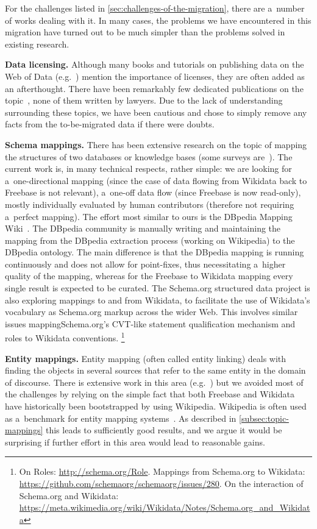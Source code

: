\documentclass{sig-alternate-2013}
\begin{document}
For the challenges listed in \autoref{sec:challenges-of-the-migration},
there are a~number of works dealing with it. In many cases, the problems we have encountered in
this migration have turned out to be much simpler than the problems solved in existing research.

\textbf{Data licensing.}
Although many books and tutorials on publishing data on the Web of Data
(e.g.~\cite{linkeddatabook,linkeddatabestpractises}) mention the importance of licenses,
they are often added as an afterthought.
There have been remarkably few dedicated publications on the
topic~\cite{licenses,licensius}, none of them written by lawyers.
Due to the lack of understanding surrounding these topics, we have been
cautious and chose to simply remove any facts from the to-be-migrated data
if there were doubts.

\textbf{Schema mappings.}
There has been extensive research on the topic of mapping the structures
of two databases or knowledge bases
(some surveys are~\cite{mappingsurvey3,mappingsurvey2,mappingsurvey1}).
The current work is, in many technical respects, rather simple:
we are looking for a~one-directional mapping (since the case of data
flowing from Wikidata back to Freebase is not relevant),
a~one-off data flow (since Freebase is now read-only),
mostly individually evaluated by human contributors
(therefore not requiring a~perfect mapping).
The effort most similar to ours is the DBpedia Mapping Wiki~\cite{lehmann2014dbpedia}.
The DBpedia community is manually writing and maintaining the mapping from
the DBpedia extraction process (working on Wikipedia) to the DBpedia ontology.
The main difference is that the DBpedia mapping is running continuously
and does not allow for point-fixes, thus necessitating a~higher quality of the mapping,
whereas for the Freebase to Wikidata mapping every single result is expected to be curated.
The Schema.org structured data project is also exploring mappings to and from Wikidata,
to facilitate the use of Wikidata's vocabulary as Schema.org markup across the wider Web.
This involves similar issues mapping\linebreak Schema.org's CVT-like statement qualification mechanism and roles
to Wikidata conventions.%
\footnote{On Roles: \url{http://schema.org/Role}. Mappings from Schema.org to Wikidata:
\url{https://github.com/schemaorg/schemaorg/issues/280}. On the interaction of Schema.org
and Wikidata: \url{https://meta.wikimedia.org/wiki/Wikidata/Notes/Schema.org_and_Wikidata}}

\textbf{Entity mappings.}
Entity mapping (often called entity linking) deals with finding the objects
in several sources that refer to the same entity in the domain of discourse.
There is extensive work in this area (e.g.~\cite{entitylinkingsurvey1,entitylinkingsurvey2})
but we avoided most of the challenges by relying on the simple fact that
both Freebase and Wikidata have historically been bootstrapped by using Wikipedia.
Wikipedia is often used as a~benchmark for entity mapping systems~\cite{entitylinkingwikipedia}.
As described in \autoref{subsec:topic-mappings} this leads to sufficiently good results,
and we argue it would be surprising if further effort in this area would lead to reasonable gains.
\end{document}
